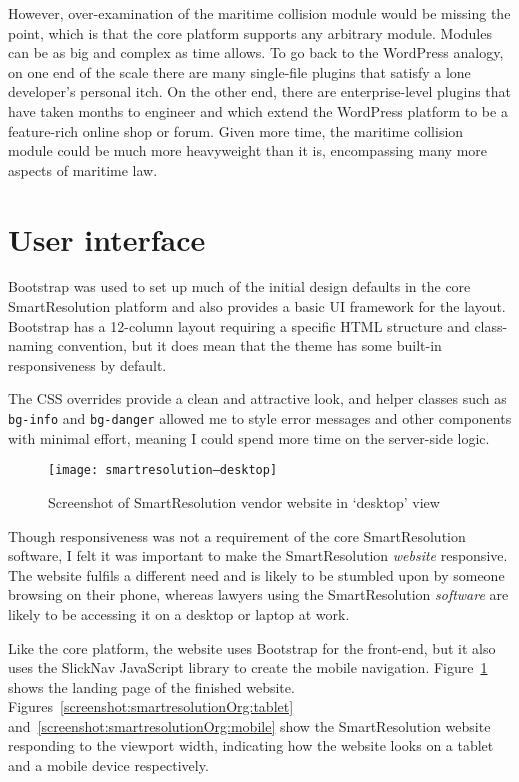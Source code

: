 However, over-examination of the maritime collision module would be missing the point, which is that the core platform supports any arbitrary module. Modules can be as big and complex as time allows. To go back to the WordPress analogy, on one end of the scale there are many single-file plugins that satisfy a lone developer's personal itch. On the other end, there are enterprise-level plugins that have taken months to engineer and which extend the WordPress platform to be a feature-rich online shop or forum. Given more time, the maritime collision module could be much more heavyweight than it is, encompassing many more aspects of maritime law.

\section{User interface}

Bootstrap was used to set up much of the initial design defaults in the core SmartResolution platform and also provides a basic UI framework for the layout. Bootstrap has a 12-column layout requiring a specific HTML structure and class-naming convention, but it does mean that the theme has some built-in responsiveness by default.

The CSS overrides provide a clean and attractive look, and helper classes such as \lstinline{bg-info} and \lstinline{bg-danger} allowed me to style error messages and other components with minimal effort, meaning I could spend more time on the server-side logic.

\begin{figure}[h!]
  \centering
    \ifimages
    \texttt{[image: smartresolution--desktop]}
    \fi
  \caption{Screenshot of SmartResolution vendor website in `desktop' view}
  \label{screenshot:smartresolutionOrg:desktop}
\end{figure}

Though responsiveness was not a requirement of the core SmartResolution software, I felt it was important to make the SmartResolution \emph{website} responsive. The website fulfils a different need and is likely to be stumbled upon by someone browsing on their phone, whereas lawyers using the SmartResolution \emph{software} are likely to be accessing it on a desktop or laptop at work.

Like the core platform, the website uses Bootstrap for the front-end, but it also uses the SlickNav JavaScript library to create the mobile navigation. Figure~\ref{screenshot:smartresolutionOrg:desktop} shows the landing page of the finished website. Figures~\ref{screenshot:smartresolutionOrg:tablet} and~\ref{screenshot:smartresolutionOrg:mobile} show the SmartResolution website responding to the viewport width, indicating how the website looks on a tablet and a mobile device respectively.

